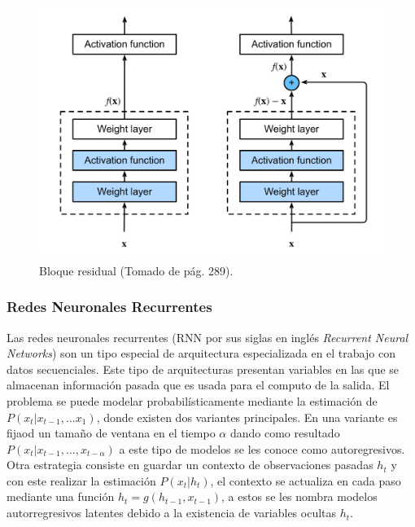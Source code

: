 \begin{figure}[h!]
	\begin{center}
		\begin{center}
			\includegraphics[scale=.3]{Graphics/resnet.png}
        \end{center}
	    \caption{Bloque residual (Tomado de \cite{d2l} pág. 289).}\label{fig:res_block}
	\end{center}
\end{figure}

\subsubsection{Redes Neuronales Recurrentes}

Las redes neuronales recurrentes (RNN por sus siglas en inglés \emph{Recurrent Neural Networks}) son
un tipo especial de arquitectura especializada en el trabajo con datos secuenciales. Este tipo de arquitecturas
presentan variables en las que se almacenan información pasada que es usada para el computo de la salida. El 
problema se puede modelar probabilísticamente mediante la estimación de $P(x_t | x_{t-1}, \dots x_{1})$,
donde existen dos variantes principales. En una variante es fijaod un tamaño de ventana en el tiempo $\alpha$ 
dando como resultado $P(x_t | x_{t-1}, \dots, x_{t-\alpha})$ a este tipo de modelos se les conoce como autoregresivos. 
Otra estrategia consiste en guardar un contexto de observaciones pasadas $h_t$ y con este realizar la estimación 
$P(x_t | h_t)$, el contexto se actualiza en cada paso mediante una función $h_t = g(h_{t-1}, x_{t-1})$, a estos 
se les nombra modelos autorregresivos latentes debido a la existencia de variables ocultas $h_t$. 

